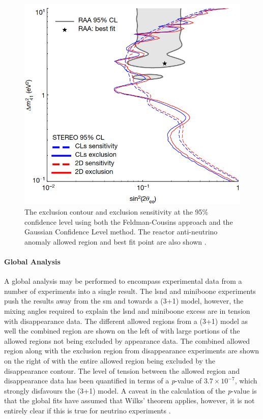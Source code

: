 \begin{figure}[h!]
    \centering
    \includegraphics[width = \largefigwidth]{figures-chap2/stereo.png}
    \caption[\gls{stereo} exclusion sensitivity at the 95\% confidence level.]{The exclusion contour and exclusion sensitivity at the 95\% confidence level using both the Feldman-Cousins approach and the Gaussian Confidence Level method. The reactor anti-neutrino anomaly allowed region and best fit point are also shown \cite{STEREO}.}
    \label{fig:stereo_exclusion_contour}
\end{figure}

\paragraph{Global Analysis}

A global analysis may be performed to encompass experimental data from a number of experiments into a single result. The \gls{lsnd} and \gls{miniboone} experiments push the results away from the \gls{sm} and towards a (3+1) model, however, the mixing angles required to explain the \gls{lsnd} and \gls{miniboone} excess are in tension with \numu disappearance data. The different allowed regions from a (3+1) model as well the combined region are shown on the left of  with large portions of the allowed regions not being excluded by appearance data. The combined allowed region along with the exclusion region from disappearance experiments are shown on the right of  with the entire allowed region being excluded by the disappearance contour. The level of tension between the allowed region and disappearance data has been quantified in terms of a \textit{p}-value of $3.7 \times 10^{-7}$, which strongly disfavours the (3+1) model. A caveat in the calculation of the \textit{p}-value is that the global fits have assumed that Wilks' theorem applies, however, it is not entirely clear if this is true for neutrino experiments \cite{wilks_theorem}\cite{snowmass_2021}. 

